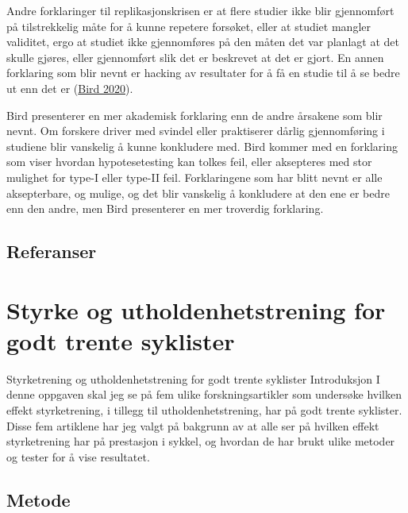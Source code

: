 \documentclass[
]{book}
\begin{document}
Andre forklaringer til replikasjonskrisen er at flere studier ikke blir
gjennomført på tilstrekkelig måte for å kunne repetere forsøket, eller
at studiet mangler validitet, ergo at studiet ikke gjennomføres på den
måten det var planlagt at det skulle gjøres, eller gjennomført slik det
er beskrevet at det er gjort. En annen forklaring som blir nevnt er
hacking av resultater for å få en studie til å se bedre ut enn det er
(\protect\hyperlink{ref-bird2020}{Bird 2020}).

Bird presenterer en mer akademisk forklaring enn de andre årsakene som
blir nevnt. Om forskere driver med svindel eller praktiserer dårlig
gjennomføring i studiene blir vanskelig å kunne konkludere med. Bird
kommer med en forklaring som viser hvordan hypotesetesting kan tolkes
feil, eller aksepteres med stor mulighet for type-I eller type-II feil.
Forklaringene som har blitt nevnt er alle aksepterbare, og mulige, og
det blir vanskelig å konkludere at den ene er bedre enn den andre, men
Bird presenterer en mer troverdig forklaring.

\hypertarget{referanser-1}{%
\section{Referanser}\label{referanser-1}}

\hypertarget{styrke-og-utholdenhetstrening-for-godt-trente-syklister}{%
\chapter{Styrke og utholdenhetstrening for godt trente
syklister}\label{styrke-og-utholdenhetstrening-for-godt-trente-syklister}}

Styrketrening og utholdenhetstrening for godt trente syklister
Introduksjon I denne oppgaven skal jeg se på fem ulike
forskningsartikler som undersøke hvilken effekt styrketrening, i tillegg
til utholdenhetstrening, har på godt trente syklister. Disse fem
artiklene har jeg valgt på bakgrunn av at alle ser på hvilken effekt
styrketrening har på prestasjon i sykkel, og hvordan de har brukt ulike
metoder og tester for å vise resultatet.

\hypertarget{metode-1}{%
\section{Metode}\label{metode-1}}
\end{document}
